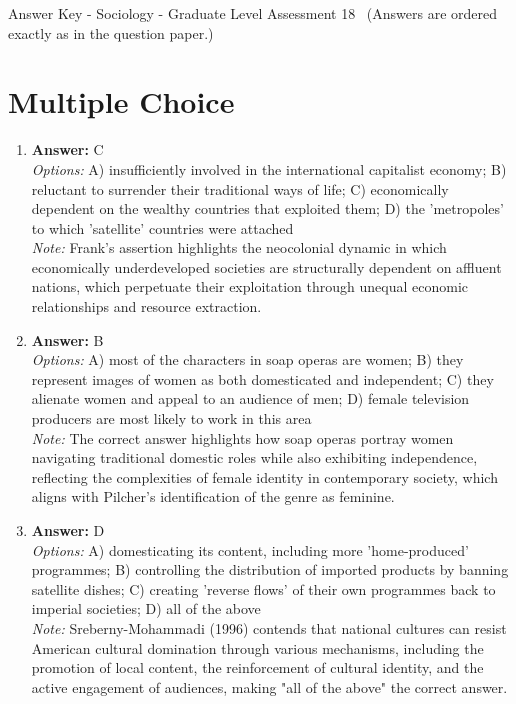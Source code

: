 \documentclass[12pt]{article}
\begin{document}
\begin{center}
Answer Key - Sociology - Graduate Level Assessment 18 \
\small (Answers are ordered exactly as in the question paper.)
\end{center}

\section*{Multiple Choice}
\begin{enumerate}[label=\arabic*.]
\item \textbf{Answer:} C
\\ \textit{Options:} A) insufficiently involved in the international capitalist economy; B) reluctant to surrender their traditional ways of life; C) economically dependent on the wealthy countries that exploited them; D) the 'metropoles' to which 'satellite' countries were attached
\\ \textit{Note:} Frank's assertion highlights the neocolonial dynamic in which economically underdeveloped societies are structurally dependent on affluent nations, which perpetuate their exploitation through unequal economic relationships and resource extraction.
\item \textbf{Answer:} B
\\ \textit{Options:} A) most of the characters in soap operas are women; B) they represent images of women as both domesticated and independent; C) they alienate women and appeal to an audience of men; D) female television producers are most likely to work in this area
\\ \textit{Note:} The correct answer highlights how soap operas portray women navigating traditional domestic roles while also exhibiting independence, reflecting the complexities of female identity in contemporary society, which aligns with Pilcher's identification of the genre as feminine.
\item \textbf{Answer:} D
\\ \textit{Options:} A) domesticating its content, including more 'home-produced' programmes; B) controlling the distribution of imported products by banning satellite dishes; C) creating 'reverse flows' of their own programmes back to imperial societies; D) all of the above
\\ \textit{Note:} Sreberny-Mohammadi (1996) contends that national cultures can resist American cultural domination through various mechanisms, including the promotion of local content, the reinforcement of cultural identity, and the active engagement of audiences, making "all of the above" the correct answer.

\end{enumerate}
\end{document}
